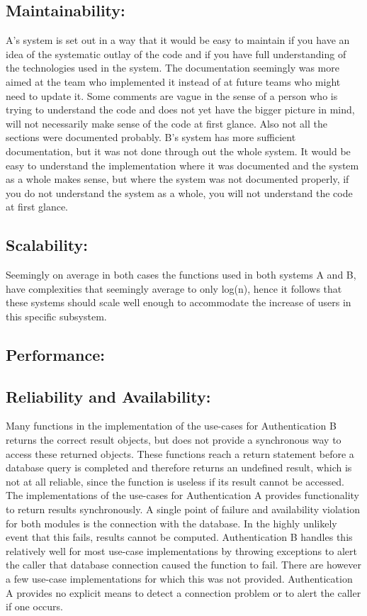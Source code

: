 \subsection{Maintainability:}
A's system is set out in a way that it would be easy to maintain if you have an idea of the systematic outlay of the code and if you have full understanding of the technologies used in the system. The documentation seemingly was more aimed at the team who implemented it instead of at future teams who might need to update it. Some comments are vague in the sense of a person who is trying to understand the code and does not yet have the bigger picture in mind, will not necessarily make sense of the code at first glance. Also not all the sections were documented probably.
B's system has more sufficient documentation, but it was not done through out the whole system. It would be easy to understand the implementation where it was documented and the system as a whole makes sense, but where the system was not documented properly, if you do not understand the system as a whole, you will not understand the code at first glance. 

\subsection{Scalability:}
Seemingly on average in both cases the functions used in both systems A and B, have complexities that seemingly average to only log(n), hence it follows that these systems should scale well enough to accommodate the increase of users in this specific subsystem. 

\subsection{Performance:}

\subsection{Reliability and Availability:}
Many functions in the implementation of the use-cases for Authentication B returns the correct result objects, but does not provide a synchronous way to access these returned objects. These functions reach a return statement before a database query is completed and therefore returns an undefined result, which is not at all reliable, since the function is useless if its result cannot be accessed. 
The implementations of the use-cases for Authentication A provides functionality to return results synchronously.
A single point of failure and availability violation for both modules is the connection with the database. In the highly unlikely event that this fails, results cannot be computed. Authentication B handles this relatively well for most use-case implementations by throwing exceptions to alert the caller that database connection caused the function to fail. There are however a few use-case implementations for which this was not provided. Authentication A provides no explicit means to detect a connection problem or to alert the caller if one occurs.

